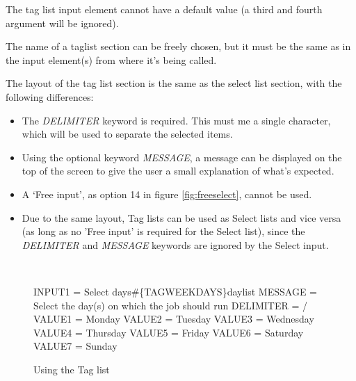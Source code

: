\documentclass[a4paper]{book}
\newcommand{\vs}{\vspace{3mm}}
\renewcommand{\indent}{\hspace*{5mm}}
\begin{document}
\vs

The tag list input element cannot have a default value (a third and fourth 
argument will be ignored).

The name of a taglist section can be freely chosen, but it must be the same 
as in the input element(s) from where it's being called.

\vs

The layout of the tag list section is the same as the select list section, 
with the following differences:

\begin{itemize}
\item The \textsl{DELIMITER} keyword is required. This must me a single character, which 
will be used to separate the selected items.

\item Using the optional keyword \textsl{MESSAGE}, a message can be displayed on the top of 
the screen to give the user a small explanation of what's expected.

\item A `Free input', as option 14 in figure \ref{fig:freeselect}, cannot be used.

\item Due to the same layout, Tag lists can be used as Select lists and vice versa (as long as no 'Free input' is 
required for the Select list), since the \textsl{DELIMITER} and \textsl{MESSAGE} keywords are 
ignored by the Select input.
\end{itemize}

\begin{figure}[ht]
\begin{minipage}[t]{\textwidth}
\hrulefill \\
\begin{ttfamily}
 \newline
\indent INPUT1 = Select days{\#}{\{}TAG\textbar WEEKDAYS{\}}daylist \newline
\noindent[WEEKDAYS] \newline
\indent MESSAGE = Select the day(s) on which the job should run \newline
\indent DELIMITER = / \newline
\indent VALUE1 = Monday \newline
\indent VALUE2 = Tuesday \newline
\indent VALUE3 = Wednesday \newline
\indent VALUE4 = Thursday \newline
\indent VALUE5 = Friday \newline
\indent VALUE6 = Saturday \newline
\indent VALUE7 = Sunday
\end{ttfamily}
\caption{Using the Tag list}\label{fig:taglist}
\hrulefill
\end{minipage}
\end{figure}
\end{document}
